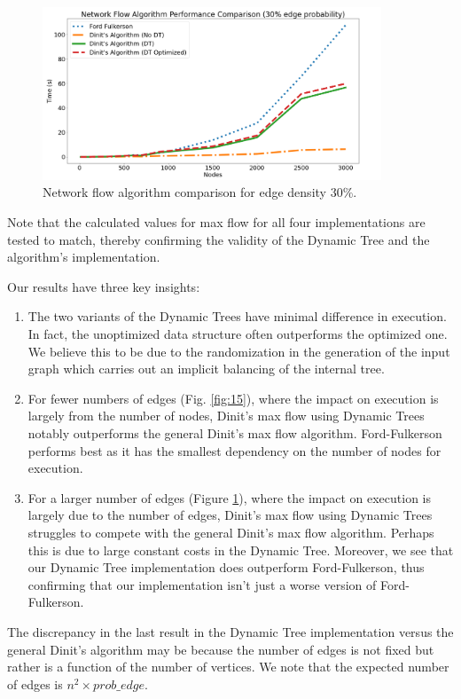 \documentclass[a4paper, 11pt]{article}
\begin{document}
\begin{figure}[H]
    \centering
    \includegraphics[width=0.9\textwidth]{img/analysis/30-result.png}
    \caption{Network flow algorithm comparison for edge density 30\%.}
    \label{fig:16}
\end{figure}

Note that the calculated values for max flow for all four implementations are tested to match, thereby confirming the validity of the Dynamic Tree and the algorithm's implementation.

Our results have three key insights:
\begin{enumerate}
    \item The two variants of the Dynamic Trees have minimal difference in execution. In fact, the unoptimized data structure often outperforms the optimized one. We believe this to be due to the randomization in the generation of the input graph which carries out an implicit balancing of the internal tree.
    \item For fewer numbers of edges (Fig. \ref{fig:15}), where the impact on execution is largely from the number of nodes, Dinit’s max flow using Dynamic Trees notably outperforms the general Dinit’s max flow algorithm. Ford-Fulkerson performs best as it has the smallest dependency on the number of nodes for execution.
    \item For a larger number of edges (Figure \ref{fig:16}), where the impact on execution is largely due to the number of edges, Dinit’s max flow using Dynamic Trees struggles to compete with the general Dinit’s max flow algorithm. Perhaps this is due to large constant costs in the Dynamic Tree. Moreover, we see that our Dynamic Tree implementation does outperform Ford-Fulkerson, thus confirming that our implementation isn’t just a worse version of Ford-Fulkerson.
\end{enumerate}

The discrepancy in the last result in the Dynamic Tree implementation versus the general Dinit’s algorithm may be because the number of edges is not fixed but rather is a function of the number of vertices. We note that the expected number of edges is $n^2 \times prob\_edge$.
\end{document}
